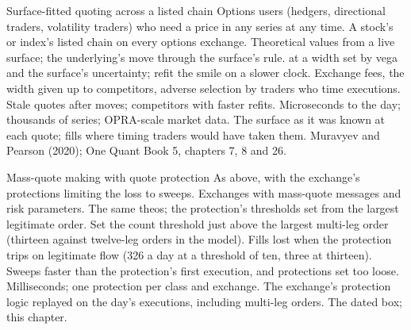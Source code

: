 \begin{strategyfile}{Surface-fitted quoting across a listed chain}\label{strat:hf:automated-options-market-making:surface}
 Options users (hedgers, directional traders, volatility traders) who need a price in any series at any time.
 A stock's or index's listed chain on every options exchange.
 Theoretical values from a live surface; the underlying's move through the surface's rule.
  at a width set by vega and the surface's uncertainty; refit the smile on a slower clock.
 Exchange fees, the width given up to competitors, adverse selection by traders who time executions.
 Stale quotes after moves; competitors with faster refits.
 Microseconds to the day; thousands of series; OPRA-scale market data.
 The surface as it was known at each quote; fills where timing traders would have taken them.
 Muravyev and Pearson (2020); One Quant Book 5, chapters 7, 8 and 26.
\end{strategyfile}

\begin{strategyfile}{Mass-quote making with quote protection}\label{strat:hf:automated-options-market-making:mass}
 As above, with the exchange's protections limiting the loss to sweeps.
 Exchanges with mass-quote messages and risk parameters.
 The same theos; the protection's thresholds set from the largest legitimate order.
 Set the count threshold just above the largest multi-leg order (thirteen against twelve-leg orders in the model).
 Fills lost when the protection trips on legitimate flow (326 a day at a threshold of ten, three at thirteen).
 Sweeps faster than the protection's first execution, and protections set too loose.
 Milliseconds; one protection per class and exchange.
 The exchange's protection logic replayed on the day's executions, including multi-leg orders.
 The dated box; this chapter.
\end{strategyfile}

